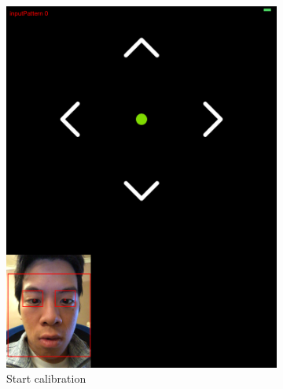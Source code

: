 \documentclass[10pt,twocolumn,letterpaper]{article}
\begin{document}
\begin{figure}[H]
    \centering
    \begin{subfigure}[t]{0.33\linewidth}
        \centering
        \includegraphics[scale=0.045]{pattern_start}
        \caption{Start calibration}
    \end{subfigure}%
    ~ 
    \begin{subfigure}[t]{0.33\linewidth}
        \centering

\end{subfigure}
\end{figure}
\end{document}
